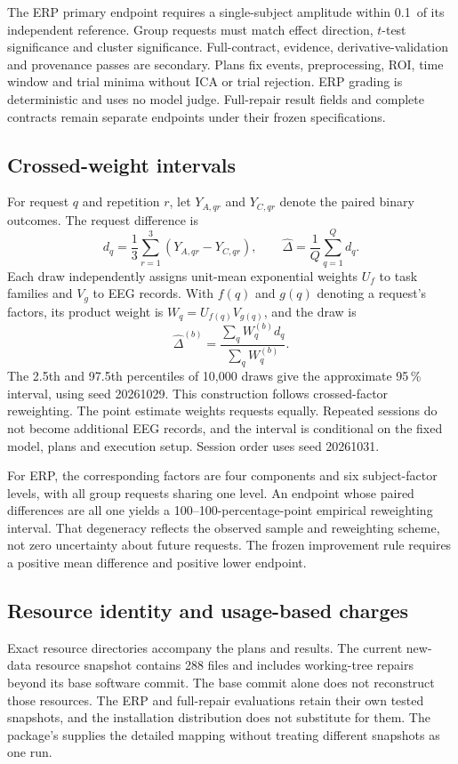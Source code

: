 The ERP primary endpoint requires a single-subject amplitude within 0.1\,\uV{} of its independent reference. Group requests must match effect direction, $t$-test significance and cluster significance. Full-contract, evidence, derivative-validation and provenance passes are secondary. Plans fix events, preprocessing, ROI, time window and trial minima without ICA or trial rejection. ERP grading is deterministic and uses no model judge. Full-repair result fields and complete contracts remain separate endpoints under their frozen specifications.

\subsection*{Crossed-weight intervals}
For request $q$ and repetition $r$, let $Y_{A,qr}$ and $Y_{C,qr}$ denote the paired binary outcomes. The request difference is
\[
 d_q=\frac{1}{3}\sum_{r=1}^{3}(Y_{A,qr}-Y_{C,qr}),
 \qquad \widehat\Delta=\frac{1}{Q}\sum_{q=1}^{Q}d_q.
\]
Each draw independently assigns unit-mean exponential weights $U_f$ to task families and $V_g$ to EEG records. With $f(q)$ and $g(q)$ denoting a request's factors, its product weight is $W_q=U_{f(q)}V_{g(q)}$, and the draw is
\[
 \widehat\Delta^{(b)}=\frac{\sum_q W_q^{(b)}d_q}{\sum_q W_q^{(b)}}.
\]
The 2.5th and 97.5th percentiles of 10,000 draws give the approximate 95\,\% interval, using seed 20261029. This construction follows crossed-factor reweighting\citep{OwenEckles2012}. The point estimate weights requests equally. Repeated sessions do not become additional EEG records, and the interval is conditional on the fixed model, plans and execution setup. Session order uses seed 20261031.

For ERP, the corresponding factors are four components and six subject-factor levels, with all group requests sharing one level. An endpoint whose paired differences are all one yields a 100--100-percentage-point empirical reweighting interval. That degeneracy reflects the observed sample and reweighting scheme, not zero uncertainty about future requests. The frozen improvement rule requires a positive mean difference and positive lower endpoint.

\subsection*{Resource identity and usage-based charges}
Exact resource directories accompany the plans and results. The current new-data resource snapshot contains 288 files and includes working-tree repairs beyond its base software commit. The base commit alone does not reconstruct those resources. The ERP and full-repair evaluations retain their own tested snapshots, and the installation distribution does not substitute for them. The package's  supplies the detailed mapping without treating different snapshots as one run.

